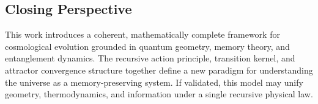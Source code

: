 \subsection{Closing Perspective}

This work introduces a coherent, mathematically complete framework for cosmological evolution grounded in quantum geometry, memory theory, and entanglement dynamics. The recursive action principle, transition kernel, and attractor convergence structure together define a new paradigm for understanding the universe as a memory-preserving system. If validated, this model may unify geometry, thermodynamics, and information under a single recursive physical law.
